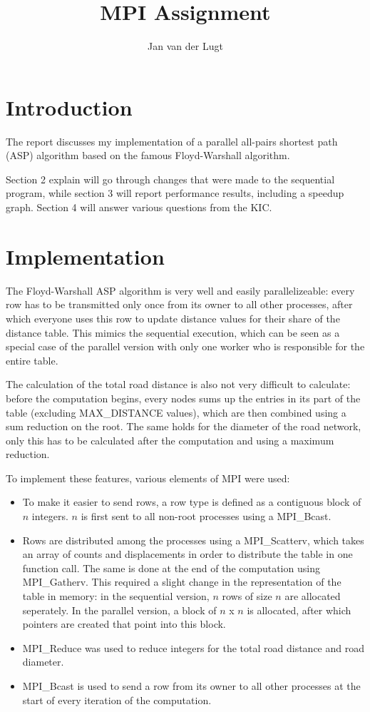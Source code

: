 \documentclass[11pt,a4paper]{article}
\title{MPI Assignment}
\author{Jan van der Lugt}
\date{}
\begin{document}
\maketitle

\section{Introduction}
The report discusses my implementation of a parallel all-pairs shortest path (ASP) algorithm based on the famous Floyd-Warshall algorithm.

Section 2 explain will go through changes that were made to the sequential program, while section 3 will report performance results, including a speedup graph. Section 4 will answer various questions from the KIC.

\section{Implementation}
The Floyd-Warshall ASP algorithm is very well and easily parallelizeable: every row has to be transmitted only once from its owner to all other processes, after which everyone uses this row to update distance values for their share of the distance table. This mimics the sequential execution, which can be seen as a special case of the parallel version with only one worker who is responsible for the entire table.

The calculation of the total road distance is also not very difficult to calculate: before the computation begins, every nodes sums up the entries in its part of the table (excluding MAX\_DISTANCE values), which are then combined using a sum reduction on the root. The same holds for the diameter of the road network, only this has to be calculated after the computation and using a maximum reduction.

To implement these features, various elements of MPI were used:
\begin{itemize}
\item To make it easier to send rows, a row type is defined as a contiguous block of $n$ integers. $n$ is first sent to all non-root processes using a MPI\_Bcast.
\item Rows are distributed among the processes using a MPI\_Scatterv, which takes an array of counts and displacements in order to distribute the table in one function call. The same is done at the end of the computation using MPI\_Gatherv. This required a slight change in the representation of the table in memory: in the sequential version, $n$ rows of size $n$ are allocated seperately. In the parallel version, a block of $n$ x $n$ is allocated, after which pointers are created that point into this block.
\item MPI\_Reduce was used to reduce integers for the total road distance and road diameter.
\item MPI\_Bcast is used to send a row from its owner to all other processes at the start of every iteration of the computation.
\end{itemize}
\end{document}
